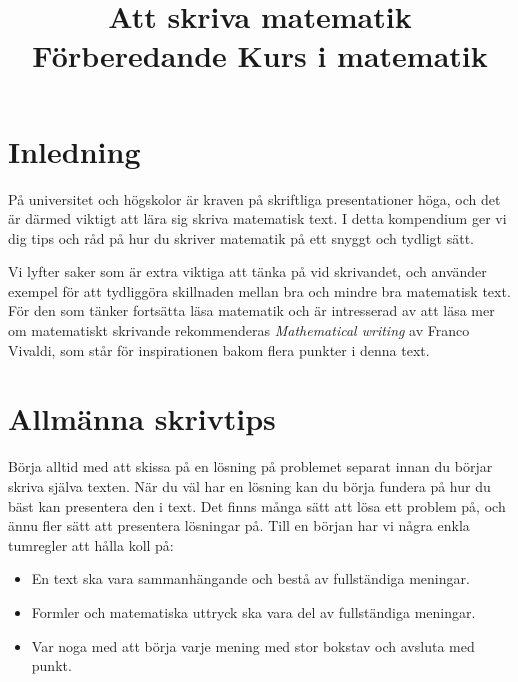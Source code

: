 \documentclass[titlepage]{article}
\title{Att skriva matematik \\ \normalsize Förberedande Kurs i matematik}
\author{}
\date{}
\begin{document}
\begin{titlepage}
    \maketitle
\end{titlepage}

\tableofcontents
\thispagestyle{empty}



\newpage
\setcounter{page}{1}

\section{Inledning}

På universitet och högskolor är kraven på skriftliga presentationer höga, och det är därmed viktigt att lära sig skriva matematisk text. I detta kompendium ger vi dig tips och råd på hur du skriver matematik på ett snyggt och tydligt sätt.

Vi lyfter saker som är extra viktiga att tänka på vid skrivandet, och använder exempel för att tydliggöra skillnaden mellan bra och mindre bra matematisk text. För den som tänker fortsätta läsa matematik och är intresserad av att läsa mer om matematiskt skrivande rekommenderas \textit{Mathematical writing} av Franco Vivaldi\cite{vivaldi}, som står för inspirationen bakom flera punkter i denna text.



\section{Allmänna skrivtips}

Börja alltid med att skissa på en lösning på problemet separat innan du börjar skriva själva texten. När du väl har en lösning kan du börja fundera på hur du bäst kan presentera den i text. Det finns många sätt att lösa ett problem på, och ännu fler sätt att presentera lösningar på. Till en början har vi några enkla tumregler att hålla koll på:

\begin{itemize}
    \item En text ska vara sammanhängande och bestå av fullständiga meningar.
    \item Formler och matematiska uttryck ska vara del av fullständiga meningar.
    \item Var noga med att börja varje mening med stor bokstav och avsluta med punkt.
\end{itemize}
\end{document}

